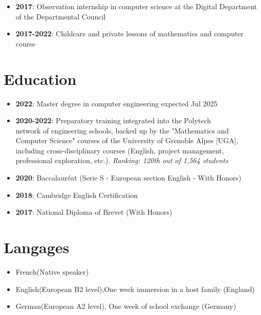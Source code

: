 \documentclass[9pt, oneside, a4paper, titlepage]{extarticle}
\begin{document}
\begin{tcolorbox}
\begin{minipage}[t]{12.8cm}
\begin{tcolorbox}[grow to right by = 0.6cm, colback = gray!25, colframe = white]
\begin{itemize}
                    \item \textbf{2017}: Observation internship in computer science at the Digital Department of the Departmental Council
                    
                    \item \textbf{2017-2022}: Childcare and private lessons of mathematics and computer course
                \end{itemize}

                \section*{Education}
                \begin{itemize}
                    \item \textbf{2022}: Master degree in computer engineering expected Jul 2025
                    \item \textbf{2020-2022}: Preparatory training integrated into the Polytech 
                    \\ network of engineering schools, backed up by the "Mathematics 
                    and Computer Science" courses of the University of Grenoble Alpes [UGA], 
                    including cross-disciplinary courses 
                    (English, project management, professional exploration, etc.). \emph{Ranking: 120th out of 1,564 students}
                    \item \textbf{2020}: Baccalauréat (Serie S - European section English - With Honors)
                    \item \textbf{2018}: Cambridge English Certification
                    \item \textbf{2017}: National Diploma of Brevet (With Honors)
                \end{itemize}

                \section*{Langages}
                    \begin{itemize}
                        \item French(Native speaker)
                        \item English(European B2 level),One week immersion in a host family (England)
                        \item German(European A2 level), One week of school exchange (Germany)
                    \end{itemize}

                
            \end{tcolorbox}
        \end{minipage}
    \end{tcolorbox}
\end{document}
